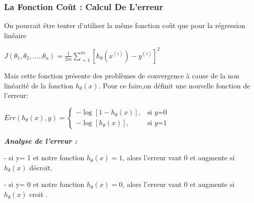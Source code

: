 \subsubsection{La Fonction Coût : Calcul De L'erreur }

On pourrait être tenter d'utiliser la même fonction coût que pour la régression linéaire 

\begin{center}
	 $J\left({\theta }_{1},{\theta }_{2},.....{\theta }_{n}\right)=\frac{1}{2m}\sum _{=1}^{m}{\left[{h}_{\theta}\left({x}^{(i)}\right) - {y}^{(i)}\right]}^2$
\end{center}
Mais cette fonction présente des problèmes de convergence à cause de la non linéarité de la fonction ${h}_{\theta}\left(x\right)$.
Pour ce faire,on définit une nouvelle fonction de l'erreur:

$Err({h}_{\theta}\left(x\right),y) = \left\{\begin{array}{ll}
-\log [1-{h}_{\theta}\left(x\right)], & \mbox{si } y\mbox{=0}   \\
-\log [{h}_{\theta}\left(x\right)], & \mbox{si } y\mbox{=1} 
\end{array}\right.$

\emph{\textbf{Analyse de l'erreur :}}

- si y= 1 et notre fonction ${h}_{\theta}\left(x\right)=1$, alors l'erreur vaut 0 et augmente si  ${h}_{\theta}\left(x\right)$ décroit.

- si y= 0 et notre fonction ${h}_{\theta}\left(x\right)=0$, alors l'erreur vaut 0 et augmente si  ${h}_{\theta}\left(x\right)$ croit . 

